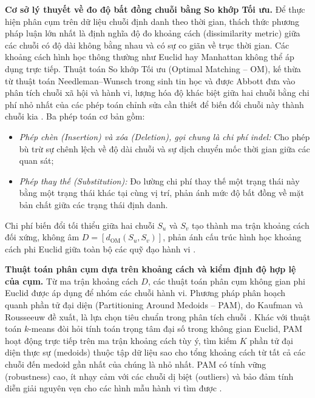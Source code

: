 \documentclass[../LuanVan.tex]{subfiles}
\begin{document}
\noindent\textbf{Cơ sở lý thuyết về đo độ bất đồng chuỗi bằng So khớp Tối ưu.} Để thực hiện phân cụm trên dữ liệu chuỗi định danh theo thời gian, thách thức phương pháp luận lớn nhất là định nghĩa độ đo khoảng cách (dissimilarity metric) giữa các chuỗi có độ dài không bằng nhau và có sự co giãn về trục thời gian. Các khoảng cách hình học thông thường như Euclid hay Manhattan không thể áp dụng trực tiếp. Thuật toán So khớp Tối ưu (Optimal Matching -- OM), kế thừa từ thuật toán Needleman--Wunsch trong sinh tin học và được Abbott đưa vào phân tích chuỗi xã hội và hành vi, lượng hóa độ khác biệt giữa hai chuỗi bằng chi phí nhỏ nhất của các phép toán chỉnh sửa cần thiết để biến đổi chuỗi này thành chuỗi kia \cite{abbott2000sequence,studer2016sequence}. Ba phép toán cơ bản gồm:
\begin{itemize}
    \item \textit{Phép chèn (Insertion) và xóa (Deletion), gọi chung là chi phí indel:} Cho phép bù trừ sự chênh lệch về độ dài chuỗi và sự dịch chuyển mốc thời gian giữa các quan sát;
    \item \textit{Phép thay thế (Substitution):} Đo lường chi phí thay thế một trạng thái này bằng một trạng thái khác tại cùng vị trí, phản ánh mức độ bất đồng về mặt bản chất giữa các trạng thái định danh.
\end{itemize}
Chi phí biến đổi tối thiểu giữa hai chuỗi $S_u$ và $S_v$ tạo thành ma trận khoảng cách đối xứng, không âm $D = [d_{\mathrm{OM}}(S_u,S_v)]$, phản ánh cấu trúc hình học khoảng cách phi Euclid giữa toàn bộ các quỹ đạo hành vi \cite{gabadinho2011traminer,khalifa2026categorical}.

\noindent\textbf{Thuật toán phân cụm dựa trên khoảng cách và kiểm định độ hợp lệ của cụm.} Từ ma trận khoảng cách $D$, các thuật toán phân cụm không gian phi Euclid được áp dụng để nhóm các chuỗi hành vi. Phương pháp phân hoạch quanh phần tử đại diện (Partitioning Around Medoids -- PAM), do Kaufman và Rousseeuw đề xuất, là lựa chọn tiêu chuẩn trong phân tích chuỗi \cite{kaufman1990pam,khalifa2026categorical}. Khác với thuật toán $k$-means đòi hỏi tính toán trọng tâm đại số trong không gian Euclid, PAM hoạt động trực tiếp trên ma trận khoảng cách tùy ý, tìm kiếm $K$ phần tử đại diện thực sự (medoids) thuộc tập dữ liệu sao cho tổng khoảng cách từ tất cả các chuỗi đến medoid gần nhất của chúng là nhỏ nhất. PAM có tính vững (robustness) cao, ít nhạy cảm với các chuỗi dị biệt (outliers) và bảo đảm tính diễn giải nguyên vẹn cho các hình mẫu hành vi tìm được \cite{khalifa2026categorical}.
\end{document}
